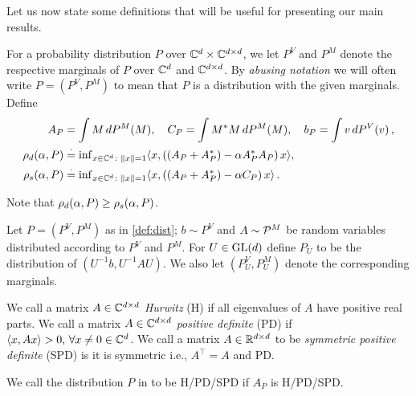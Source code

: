 Let us now state some definitions that will be useful for presenting our main results. 
\begin{definition}\label{def:dist}
For a probability distribution $P$ over $\C^d \times \C^{d\times d}$, we let $P^V$ and $P^M$ 
denote the respective marginals of $P$ over $\C^d$ and $\C^{d\times d}$. 
By \emph{abusing notation} we will often write $P = (P^V,P^M)$ to mean that $P$ is a distribution with the given marginals.
Define
\begin{align*}
A_P&=\int M\, dP^M(M),\quad C_P=\int M^* M \,dP^M(M), \quad b_P=\int v\, dP^V(v)\,,\\
\rhod{P}&\eqdef {\inf}_{x\in\C^d\colon\norm{x}=1}\ip{x,\left((A_P+A_P^*)-\alpha A_P^* A_P\right)x},\\ \rhos{P}&\eqdef{\inf}_{x\in \C^d\colon\norm{x}=1}\ip{x,\left((A_P+A_P^*)-\alpha C_P\right)x}\,.
\end{align*}
\end{definition}
Note that $\rhod{P}\ge \rhos{P}$.   
\begin{definition}\label{def:simdist}
Let $P=(P^V,P^M)$ as in \cref{def:dist}; $b\sim P^V$ and $A\sim \P^M$ be random variables distributed according to $P^V$ and $P^M$. For $U\in \gld$ define $P_U$ to be the  distribution of $(U^{-1}b,U^{-1}AU)$. We also let
$(P_U^V,P_U^M)$ denote the corresponding marginals. 
\end{definition}
\begin{definition}
We call a matrix $A\in \C^{\dcd}$  \emph{Hurwitz} (H) if all eigenvalues of $A$ have positive real parts. We call a matrix $A\in \C^{\dcd}$ \emph{positive definite} (PD) if $\ip{x,Ax} >0,\,\forall x\neq 0 \in \C^{d}$.  
We call a matrix $A\in \R^{\dcd}$ to be \emph{symmetric positive definite} (SPD) is it is symmetric i.e., $A^\top=A$ and PD. 
\end{definition}
\begin{definition}\label{distpd}
We call the distribution $P$ in  to be H/PD/SPD if $A_P$ is H/PD/SPD.
\end{definition}
